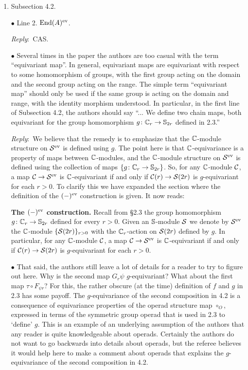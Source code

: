 \documentclass{amsart}
\newcommand{\ar}{\medskip\noindent\textit{Reply}:\ }
\def\subitem{\medskip\noindent$\bullet$ }
\begin{document}
\begin{enumerate}
	\item Subsection 4.2.

	\subitem Line 2. $\mathrm{End}(A)^{\mathrm{ev}}$.

	\ar CAS.

	\subitem Several times in the paper the authors are too casual with the term “equivariant map”.
	In general, equivariant maps are equivariant with respect to some homomorphism of groups, with the first group acting on the domain and the second group acting on the range.
	The simple term “equivariant map” should only be used if the same group is acting on the domain and range, with the identity morphism understood.
	In particular, in the first line of Subsection 4.2, the authors should say “... We define two chain maps, both equivariant for the group homomorphism \(g \colon \mathbb{C}_r \rightarrow \mathbb{S}_{2r}\) defined in 2.3.”

	\ar We believe that the remedy is to emphasize that the $\mathbb{C}$-module structure on $\mathcal{S}^{\mathrm{ev}}$ is defined using $g$.
	The point here is that $\mathbb{C}$-equivariance is a property of maps between $\mathbb{C}$-modules, and the $\mathbb{C}$-module structure on $\mathcal{S}^{\mathrm{ev}}$ is defined using the collection of maps $\{g \colon \mathbb{C}_r \to \mathbb{S}_{2r}\}$.
	So, for any $\mathbb{C}$-module $\mathcal{C}$, a map $\mathcal{C} \to \mathcal{S}^{\mathrm{ev}}$ is $\mathbb{C}$-equivariant if and only if $\mathcal{C}(r) \to \mathcal{S}(2r)$ is $g$-equivariant for each $r > 0$.
	To clarify this we have expanded the section where the definition of the $(-)^{\mathrm{ev}}$ construction is given.
	It now reads:

	\medskip\noindent \textbf{The $(-)^{\mathrm{ev}}$ construction.}
	Recall from \S2.3 the group homomorphism $g \colon \mathbb{C}_r \to \mathbb{S}_{2r}$ defined for every $r > 0$.
	Given an $\mathbb{S}$-module $\mathcal{S}$ we denote by $\mathcal{S}^{\mathrm{ev}}$ the $\mathbb{C}$-module $\{\mathcal{S}(2r)\}_{r>0}$ with the $\mathbb{C}_r$-action on $\mathcal{S}(2r)$ defined by $g$.
	In particular, for any $\mathbb{C}$-module $\mathcal{C}$, a map $\mathcal{C} \to \mathcal{S}^{\mathrm{ev}}$ is $\mathbb{C}$-equivariant if and only if $\mathcal{C}(r) \to \mathcal{S}(2r)$ is $g$-equivariant for each $r > 0$.

	\subitem That said, the authors still leave a lot of details for a reader to try to figure out here.
	Why is the second map \(G_r\psi\) \(g\)-equivariant?
	What about the first map \(\tau \circ F_{\psi r}\)?
	For this, the rather obscure (at the time) definition of \(f\) and \(g\) in 2.3 has some payoff.
	The \(g\)-equivariance of the second composition in 4.2 is a consequence of equivariance properties of the operad structure map \(\circ_O\), expressed in terms of the symmetric group operad that is used in 2.3 to ‘define’ \(g\).
	This is an example of an underlying assumption of the authors that any reader is quite knowledgeable about operads.
	Certainly the authors do not want to go backwards into details about operads, but the referee believes it would help here to make a comment about operads that explains the \(g\)-equivariance of the second composition in 4.2.


\end{enumerate}
\end{document}
